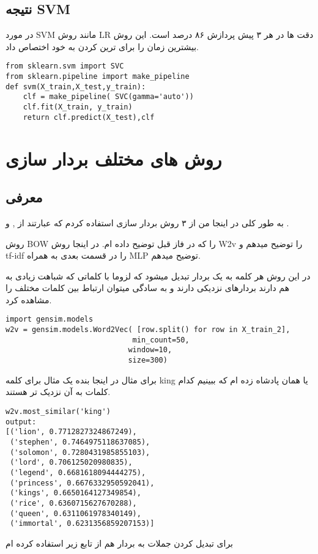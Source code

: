 \documentclass{article}[12pt]
\begin{document}
\subsection{نتیجه SVM}

در مورد SVM مانند روش LR دقت ها در هر ۳ پیش پردازش ۸۶ درصد است. این روش بیشترین زمان را برای ترین کردن به خود اختصاص داد. 
\begin{verbatim}
from sklearn.svm import SVC
from sklearn.pipeline import make_pipeline
def svm(X_train,X_test,y_train):
    clf = make_pipeline( SVC(gamma='auto'))
    clf.fit(X_train, y_train)
    return clf.predict(X_test),clf
\end{verbatim}
\clearpage
\section{روش های مختلف بردار سازی }
\subsection{معرفی}
به طور کلی در اینجا من از ۳ روش بردار سازی استفاده کردم که عبارتند از 
,
 و
.

روش BOW را که در فاز قبل توضیح داده ام. در اینجا روش W2v
را توضیح میدهم و tf-idf را در قسمت بعدی به همراه MLP توضیح میدهم. 


در این روش هر کلمه به یک بردار تبدیل میشود که لزوما با کلماتی که شباهت زیادی به هم دارند بردارهای نزدیکی دارند و به سادگی میتوان ارتباط بین کلمات مختلف را مشاهده کرد. 
\begin{verbatim}
import gensim.models
w2v = gensim.models.Word2Vec( [row.split() for row in X_train_2], 
                             min_count=50,
                            window=10, 
                            size=300)
\end{verbatim}
برای مثال در اینجا بنده یک مثال برای کلمه king یا همان پادشاه زده ام که ببینیم کدام کلمات به آن نزدیک تر هستند. 

\begin{verbatim}
w2v.most_similar('king')
output:
[('lion', 0.7712827324867249),
 ('stephen', 0.7464975118637085),
 ('solomon', 0.7280431985855103),
 ('lord', 0.706125020980835),
 ('legend', 0.6681618094444275),
 ('princess', 0.6676332950592041),
 ('kings', 0.6650164127349854),
 ('rice', 0.6360715627670288),
 ('queen', 0.6311061978340149),
 ('immortal', 0.6231356859207153)]
\end{verbatim}
برای تبدیل کردن جملات به بردار هم از تابع زیر استفاده کرده ام
\end{document}
